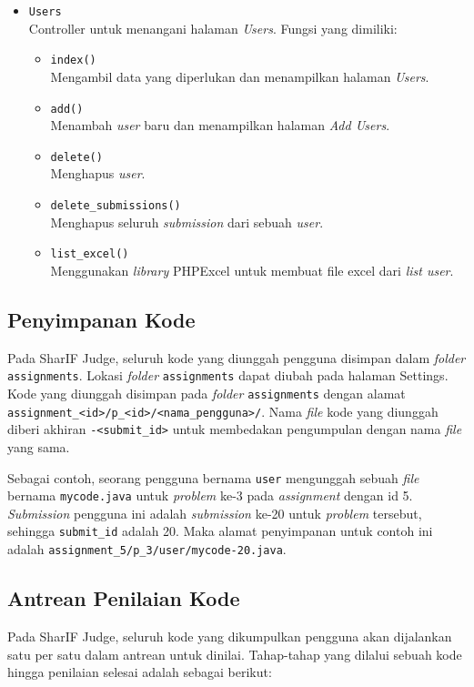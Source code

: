 \begin{itemize}
	\item \verb|Users| \\ Controller untuk menangani halaman \textit{Users}. Fungsi yang dimiliki:
	\begin{itemize}
        \item \verb|index()| \\ Mengambil data yang diperlukan dan menampilkan halaman \textit{Users}.
        \item \verb|add()| \\ Menambah \textit{user} baru dan menampilkan halaman \textit{Add Users}.
        \item \verb|delete()| \\ Menghapus \textit{user}.
        \item \verb|delete_submissions()| \\ Menghapus seluruh \textit{submission} dari sebuah \textit{user}.
         \item \verb|list_excel()| \\ Menggunakan \textit{library} PHPExcel untuk membuat file excel dari \textit{list user}.
	\end{itemize}
\end{itemize}

\subsection{Penyimpanan Kode}
\label{subsec:3:simpan}

Pada SharIF Judge, seluruh kode yang diunggah pengguna disimpan dalam \textit{folder} \verb|assignments|. Lokasi \textit{folder} \verb|assignments| dapat diubah pada halaman Settings. Kode yang diunggah disimpan pada \textit{folder} \verb|assignments| dengan alamat \verb|assignment_<id>/p_<id>/<nama_pengguna>/|. Nama \textit{file} kode yang diunggah diberi akhiran \verb|-<submit_id>| untuk membedakan pengumpulan dengan nama \textit{file} yang sama. 

Sebagai contoh, seorang pengguna bernama \verb|user| mengunggah sebuah \textit{file} bernama \verb|mycode.java| untuk \textit{problem} ke-3 pada \textit{assignment} dengan id 5. \textit{Submission} pengguna ini adalah \textit{submission} ke-20 untuk \textit{problem} tersebut, sehingga \verb|submit_id| adalah 20. Maka alamat penyimpanan untuk contoh ini adalah \verb|assignment_5/p_3/user/mycode-20.java|.


\subsection{Antrean Penilaian Kode}
\label{subsec:3:antrean} 
Pada SharIF Judge, seluruh kode yang dikumpulkan pengguna akan dijalankan satu per satu dalam antrean untuk dinilai. Tahap-tahap yang dilalui sebuah kode hingga penilaian selesai adalah sebagai berikut:

